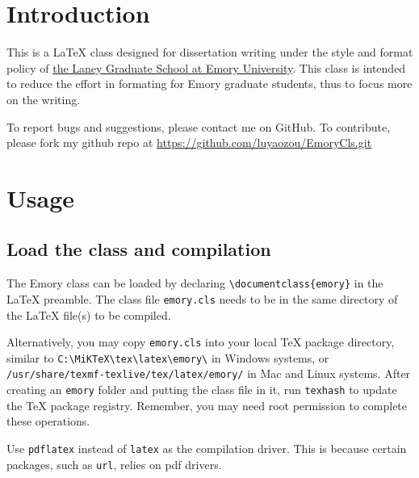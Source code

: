 \documentclass[final]{emory}
\begin{document}
\maketoc

\chapter{Introduction}

This is a \LaTeX{} class designed for dissertation writing under the style and
format policy of \href{http://www.graduateschool.emory.edu/uploads/academics/completion/Submit%20Thesis%20or%20Dissertation.doc}{the Laney Graduate School at Emory University}.\autocite{emory-style}
This class is
intended to reduce the effort in formating for Emory graduate students, thus 
to focus more on the writing. 

To report bugs and suggestions, please contact me on GitHub. To contribute, 
please fork my github repo at \url{https://github.com/luyaozou/EmoryCls.git}

\chapter{Usage}
\section{Load the class and compilation}
The Emory class can be loaded by declaring
\Verb|\documentclass{emory}| in the \LaTeX{} preamble. The class file
\Verb|emory.cls| needs to be in the same directory of the \LaTeX{} file(s) to be 
compiled. 

Alternatively, you may copy \Verb|emory.cls| into your local \TeX{} package 
directory, similar to \Verb|C:\MiKTeX\tex\latex\emory\| in Windows systems, or\\
\Verb|/usr/share/texmf-texlive/tex/latex/emory/| in Mac and Linux systems. After
creating an \Verb|emory| folder and putting the class file in it, run
\Verb|texhash| to update the \TeX{} package registry. Remember, you may need
root permission to complete these operations. 

Use \Verb|pdflatex| instead of \Verb|latex| as the compilation driver. This
is because certain packages, such as \Verb|url|, relies on pdf drivers.
\end{document}
